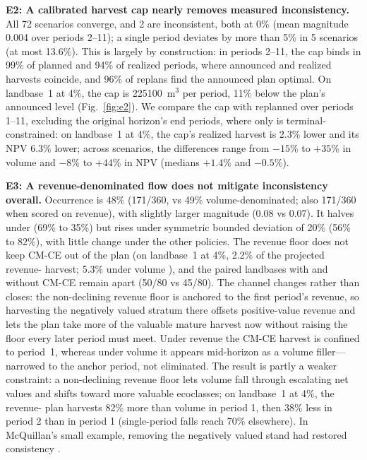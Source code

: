 \textbf{E2: A calibrated harvest cap nearly removes measured inconsistency.} All 72 scenarios converge, and 2 are inconsistent, both at 0\% (mean magnitude 0.004 over periods 2--11); a single period deviates by more than 5\% in 5 scenarios (at most 13.6\%). This is largely by construction: in periods 2--11, the cap binds in 99\% of planned and 94\% of realized periods, where announced and realized harvests coincide, and 96\% of replans find the announced plan optimal. On landbase~1 at 4\%, the cap is \num{225100}~m\(^3\) per period, 11\% below the  plan's announced level (Fig.~\ref{fig:e2}). We compare the cap with replanned  over periods 1--11, excluding the original horizon's end periods, where only  is terminal-constrained: on landbase~1 at 4\%, the cap's realized harvest is 2.3\% lower and its NPV 6.3\% lower; across scenarios, the differences range from $-15$\% to $+35$\% in volume and $-8$\% to $+44$\% in NPV (medians $+1.4$\% and $-0.5$\%).

\textbf{E3: A revenue-denominated flow does not mitigate inconsistency overall.} Occurrence is 48\% (171/360, vs 49\% volume-denominated; also 171/360 when scored on revenue), with slightly larger magnitude (0.08 vs 0.07). It halves under  (69\% to 35\%) but rises under symmetric bounded deviation of 20\% (56\% to 82\%), with little change under the other policies. The revenue floor does not keep CM-CE out of the plan (on landbase~1 at 4\%, 2.2\% of the projected revenue- harvest; 5.3\% under volume ), and the paired landbases with and without CM-CE remain apart (50/80 vs 45/80). The channel changes rather than closes: the non-declining revenue floor is anchored to the first period's revenue, so harvesting the negatively valued stratum there offsets positive-value revenue and lets the plan take more of the valuable mature harvest now without raising the floor every later period must meet. Under revenue  the CM-CE harvest is confined to period~1, whereas under volume  it appears mid-horizon as a volume filler---narrowed to the anchor period, not eliminated. The  result is partly a weaker constraint: a non-declining revenue floor lets volume fall through escalating net values and shifts toward more valuable ecoclasses; on landbase~1 at 4\%, the revenue- plan harvests 82\% more than volume  in period 1, then 38\% less in period 2 than in period 1 (single-period falls reach 70\% elsewhere). In McQuillan's small example, removing the negatively valued stand had restored consistency \citep[p.~25]{daugherty1991credibility}.

